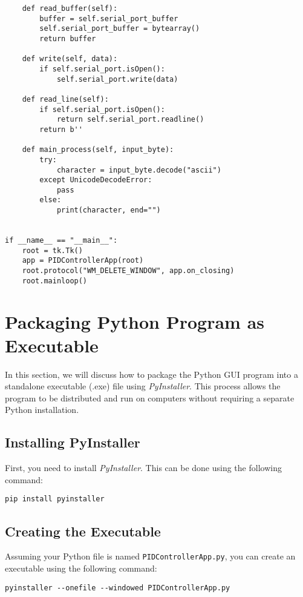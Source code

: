 \documentclass{article}
\begin{document}
\begin{verbatim}
    def read_buffer(self):
        buffer = self.serial_port_buffer
        self.serial_port_buffer = bytearray()
        return buffer

    def write(self, data):
        if self.serial_port.isOpen():
            self.serial_port.write(data)

    def read_line(self):
        if self.serial_port.isOpen():
            return self.serial_port.readline()
        return b''

    def main_process(self, input_byte):
        try:
            character = input_byte.decode("ascii")
        except UnicodeDecodeError:
            pass
        else:
            print(character, end="")


if __name__ == "__main__":
    root = tk.Tk()
    app = PIDControllerApp(root)
    root.protocol("WM_DELETE_WINDOW", app.on_closing)
    root.mainloop()
\end{verbatim}


\section{Packaging Python Program as Executable}

In this section, we will discuss how to package the Python GUI program into a standalone executable (.exe) file using \textit{PyInstaller}. This process allows the program to be distributed and run on computers without requiring a separate Python installation.

\subsection{Installing PyInstaller}

First, you need to install \textit{PyInstaller}. This can be done using the following command:

\begin{verbatim}
pip install pyinstaller
\end{verbatim}

\subsection{Creating the Executable}

Assuming your Python file is named \texttt{PIDControllerApp.py}, you can create an executable using the following command:

\begin{verbatim}
pyinstaller --onefile --windowed PIDControllerApp.py
\end{verbatim}
\end{document}
